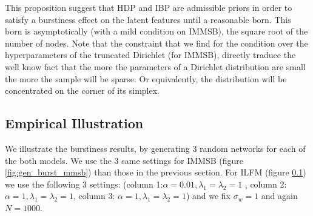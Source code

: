This proposition suggest that HDP and IBP are admissible priors in order to satisfy a burstiness effect on the latent features until a reasonable born. This born is asymptotically  (with a mild condition on IMMSB), the square root of the number of nodes. Note that the constraint that we find for the condition over the hyperparameters of the truncated Dirichlet (for IMMSB), directly traduce the well know fact that the more the parameters of a Dirichlet distribution are small the more the sample will be sparse. Or equivalently, the distribution will be concentrated on the corner of its simplex.

\subsection{Empirical Illustration}

We illustrate the burstiness results, by generating 3 random networks for each of the both models. We use the 3 same settings for IMMSB (figure \ref{fig:gen_burst_mmsb}) than those in the previous section. For ILFM (figure \ref{}) we use the following 3 settings: (column 1:$\alpha=0.01,  \lambda_1=\lambda_2=1$ , column 2:$\alpha=1, \lambda_1=\lambda_2=1$, column 3: $\alpha=1, \lambda_1=\lambda_2=1$) and we fix $\sigma_w=1$ and again $N=1000$.

